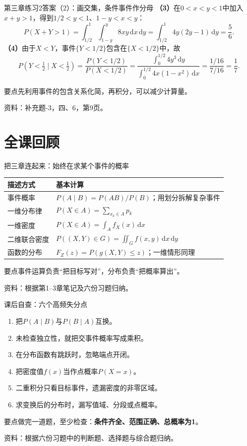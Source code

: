 \documentclass[aspectratio=169,10pt]{beamer}
\newcommand{\dd}{\,\mathrm{d}}
\newcommand{\source}[1]{\vfill{\color{Muted}\fontsize{6.5}{8}\selectfont 资料：#1\par}}
\newcommand{\key}[1]{\begin{block}{要点}#1\end{block}}
\begin{document}
\begin{answerframe}{第三章练习2答案（2）：画交集，条件事件作分母}
\textbf{（3）}在$0<x<y<1$中加入$x+y>1$，得到$1/2<y<1$、$1-y<x<y$：
\[
P(X+Y>1)=\int_{1/2}^1\!\int_{1-y}^y8xy\dd x\dd y
=\int_{1/2}^1 4y(2y-1)\dd y=\boxed{\frac56}.
\]
\textbf{（4）}由于$X<Y$，事件$\{Y<1/2\}$包含在$\{X<1/2\}$中，故
\[
P(Y<\tfrac12\mid X<\tfrac12)=\frac{P(Y<1/2)}{P(X<1/2)}
=\frac{\int_0^{1/2}4y^3\dd y}{\int_0^{1/2}4x(1-x^2)\dd x}
=\frac{1/16}{7/16}=\boxed{\frac17}.
\]
\key{先利用事件的包含关系化简，再积分，可以减少计算量。}
\source{补充题-3，四、6，第9页。}
\end{answerframe}

\section{全课回顾}
\begin{frame}[t]{把三章连起来：始终在求某个事件的概率}
\renewcommand{\arraystretch}{1.6}
\begin{tabular}{p{3cm}p{9.7cm}}
\toprule
\textbf{描述方式} & \textbf{基本计算}\\\midrule
事件概率 & $P(A\mid B)=P(AB)/P(B)$；用划分拆解复杂事件\\
一维分布律 & $P(X\in A)=\sum_{x_k\in A}p_k$\\
一维密度 & $P(X\in A)=\int_Af_X(x)\dd x$\\
二维联合密度 & $P((X,Y)\in G)=\iint_Gf(x,y)\dd x\dd y$\\
函数的分布 & $F_Z(z)=P(g(X,Y)\le z)$；一维情形同理\\\bottomrule
\end{tabular}
\key{事件运算负责“把目标写对”，分布负责“把概率算出”。}
\source{根据第1--3章笔记及六份习题归纳。}
\end{frame}

\begin{frame}[t]{课后自查：六个高频失分点}
\begin{enumerate}
\item 把$P(A\mid B)$与$P(B\mid A)$互换。
\item 未检查独立性，就把交事件概率写成乘积。
\item 在分布函数有跳跃时，忽略端点开闭。
\item 把密度值$f(x)$当作点概率$P(X=x)$。
\item 二重积分只看目标事件，遗漏密度的非零区域。
\item 求变换后的分布时，漏写值域、分段或点概率。
\end{enumerate}
\key{做完一道题，至少检查：\textbf{条件齐全、范围正确、总概率为1}。}
\source{根据六份习题中的判断题、选择题与综合题归纳。}
\end{frame}
\end{document}
